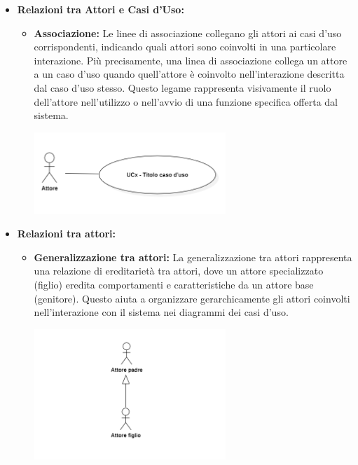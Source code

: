 \begin{itemize}
    \item \textbf{Relazioni tra Attori e Casi d'Uso:}
    \begin{itemize}
        \item \textbf{Associazione:}
        Le linee di associazione collegano gli attori ai casi d'uso corrispondenti, indicando quali attori sono coinvolti in una particolare interazione. Più precisamente, una linea di associazione collega un attore a un caso d'uso quando quell'attore è coinvolto nell'interazione descritta dal caso d'uso stesso. Questo legame rappresenta visivamente il ruolo dell'attore nell'utilizzo o nell'avvio di una funzione specifica offerta dal sistema.
        \begin{minipage}[t]{\linewidth}
            \centering
            \includegraphics[width=0.6\textwidth]{../Images/NormeDiProgetto/Associazione.PNG}
        \end{minipage}
    \end{itemize}

    \item \textbf{Relazioni tra attori:}
    \begin{itemize}
        \item \textbf{Generalizzazione tra attori:}
        La generalizzazione tra attori rappresenta una relazione di ereditarietà tra attori, dove un attore specializzato (figlio) eredita comportamenti e caratteristiche da un attore base (genitore). Questo aiuta a organizzare gerarchicamente gli attori coinvolti nell'interazione con il sistema nei diagrammi dei casi d'uso.
        \begin{minipage}[t]{\linewidth}
            \centering
            \includegraphics[width=0.6\textwidth]{../Images/NormeDiProgetto/GeneralizzazioneAttori.PNG}
        \end{minipage}
    \end{itemize}
    

\end{itemize}
